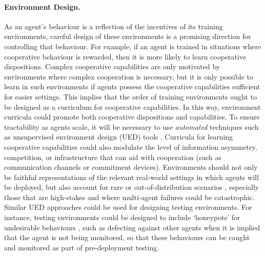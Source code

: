 \paragraph{Environment Design.}
As an agent's behaviour is a reflection of the incentives of its training environments, careful design of these environments is a promising direction for controlling that behaviour. For example, if an agent is trained in situations where cooperative behaviour is rewarded, then it is more likely to learn cooperative dispositions. 
Complex cooperative capabilities are only motivated by environments where complex cooperation is necessary, but it is only possible to learn in such environments if agents possess the cooperative capabilities sufficient for easier settings. This implies that the order of training environments ought to be designed as a curriculum for cooperative capabilities. In this way, environment curricula could promote both cooperative dispositions and capabilities. To ensure tractability as agents scale, it will be necessary to use \textit{automated} techniques such as unsupervised environment design (UED) tools \citep{dennis2020emergent, wang2019paired, justesen2018illuminating}. Curricula for learning cooperative capabilities could also modulate the level of information asymmetry, competition, or infrastructure that can aid with cooperation (such as communication channels or commitment devices). Environments should not only be faithful representations of the relevant real-world settings in which agents will be deployed, but also account for rare or out-of-distribution scenarios \citep{dennis2020emergent,jiang2021replay, parker2022evolving, samvelyan2023maestro,team2023human, beukman2024refining}, especially those that are high-stakes and where multi-agent failures could be catastrophic. Similar UED approaches could be used for designing testing environments. For instance, testing environments could be designed to include `honeypots' for undesirable behaviours \citep{Balesni2024}, such as defecting against other agents when it is implied that the agent is not being monitored, so that these behaviours can be caught and monitored as part of pre-deployment testing.


